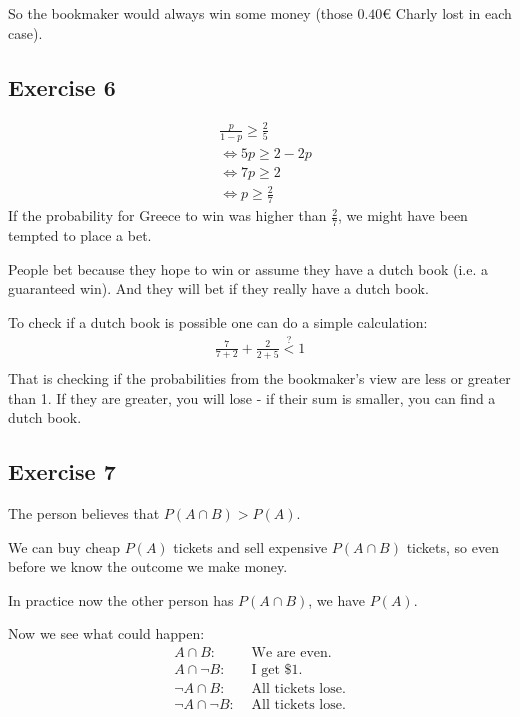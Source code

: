 \documentclass[../main/Notes.tex]{subfiles}
\begin{document}
So the bookmaker would always win some money (those $0.40 \euro$ Charly lost in each case).

\subsection*{Exercise 6}
\begin{align*}
& \frac{p}{1-p} \geq \frac{2}{5}\\
& \Leftrightarrow 5p \geq 2 - 2p\\
& \Leftrightarrow 7p \geq 2\\
& \Leftrightarrow p \geq \frac{2}{7}
\end{align*}
If the probability for Greece to win was higher than $\frac{2}{7}$, we might have been tempted to place a bet.

People bet because they hope to win or assume they have a dutch book (i.e. a guaranteed win). And they will bet if they really have a dutch book.

To check if a dutch book is possible one can do a simple calculation:
\begin{align*}
\frac{7}{7+2} + \frac{2}{2+5} \stackrel{?}{<} 1 \\
\end{align*}
That is checking if the probabilities from the bookmaker's view are less or greater than 1. If they are greater, you will lose - if their sum is smaller, you can find a dutch book.


\subsection*{Exercise 7}
The person believes that $P(A \cap B)>P(A)$.

We can buy cheap $P(A)$ tickets and sell expensive $P(A\cap B)$ tickets, so even before we know the outcome we make money.

In practice now the other person has $P(A \cap B)$, we have $P(A)$.

Now we see what could happen:
\begin{align*}
     A \cap      B:& \mbox{ We are even.}      \\
     A \cap \neg B:& \mbox{ I get \$ 1.}       \\
\neg A \cap      B:& \mbox{ All tickets lose.} \\
\neg A \cap \neg B:& \mbox{ All tickets lose.}
\end{align*}
\end{document}
